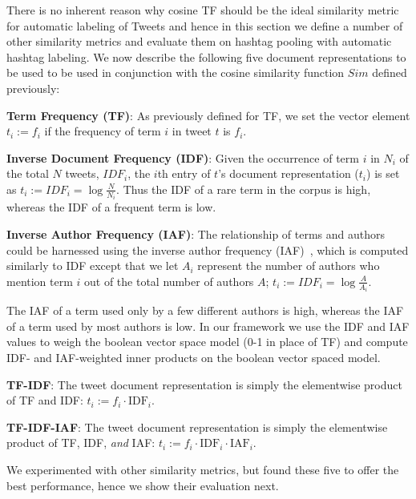 \documentclass{sig-alternate}
\begin{document}
There is no inherent reason why cosine TF should be the ideal
similarity metric for automatic labeling of Tweets and hence in this
section we define a number of other similarity metrics and 
evaluate them on hashtag pooling with automatic hashtag labeling.
We now describe the following five document representations to be used to
be used in conjunction with the cosine similarity function $\mathit{Sim}$
defined previously:
\begin{description}
\itemsep -2pt
\item{\bf Term Frequency (TF)}: As previously defined for TF, we set the vector element $t_i := f_i$ if the frequency of term $i$ in tweet $t$ is $f_i$.
\item{\bf Inverse Document Frequency (IDF)}:  Given the occurrence of term $i$ in $N_i$ of the total $N$ tweets, $\mathit{IDF}_i$, the $i$th entry of $t$'s document representation ($t_i$) is set as
$t_i := \mathit{IDF}_i = \log{\frac{N}{N_i}}.$
Thus the IDF of a rare term in the corpus is high, whereas the IDF of a frequent term is low. 
\item{\bf Inverse Author Frequency (IAF)}: The relationship of terms and authors could be harnessed using the inverse author frequency (IAF)~\cite{iaf}, which is computed similarly to IDF except that we let $A_i$ represent the number of authors who mention term $i$ out of the total number of authors $A$;
$t_i := \mathit{IDF}_i = \log{\frac{A}{A_i}}.$

The IAF of a term used only by a few different authors is high, whereas the IAF of a term used by most authors is low. In our framework we use the IDF and IAF values to weigh the boolean vector space model (0-1 in place of TF) and compute IDF- and IAF-weighted inner products on the boolean vector spaced model.
\item{\bf TF-IDF}: The tweet document representation is simply the elementwise product of TF and IDF: $t_i := f_i \cdot \mathrm{IDF}_i$.
\item{\bf TF-IDF-IAF}: The tweet document representation is simply the elementwise product of TF, IDF, \emph{and} IAF: $t_i := f_i \cdot \mathrm{IDF}_i \cdot \mathrm{IAF}_i$.
\end{description}
\vspace{-2mm}
We experimented with other similarity metrics, but found these five to
offer the best performance, hence we show their evaluation next.
\end{document}
